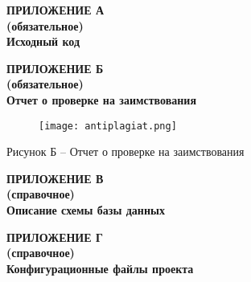 \newpage
\begin{center}
  \textbf{
  \MakeUppercase{Приложение А}\\
  (обязательное)\\
  Исходный код}
  \end{center}
  
  
  
  
  
  
  \newpage

  \begin{center}
    \textbf{
      \MakeUppercase{Приложение Б}\\
      (обязательное)\\
      Отчет о проверке на заимствования}
    \end{center}
    
    \begin{figure}[H]
      \centering
      \texttt{[image: antiplagiat.png]} 
    \end{figure}
    \vspace{-5mm}
      \centerline{Рисунок Б -- Отчет о проверке на заимствования}
    
    \newpage
  
  \begin{center}
  \textbf{
  \MakeUppercase{Приложение В}\\
  (справочное)\\
  Описание схемы базы данных}
  \end{center}
  
  
  
  \newpage
  
  \begin{center}
  \textbf{
  \MakeUppercase{Приложение Г}\\
  (справочное)\\
  Конфигурационные файлы проекта}
  \end{center}
  
  
  \newpage
  